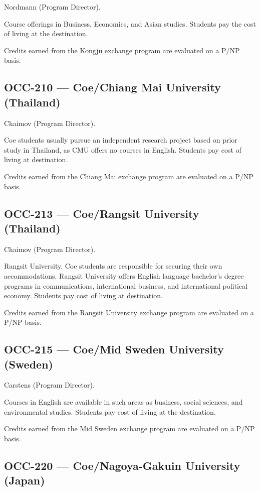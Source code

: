 \documentclass[
  letterpaper,
]{scrbook}
\begin{document}
Nordmann (Program Director).

Course offerings in Business, Economics, and Asian studies. Students pay
the cost of living at the destination.

Credits earned from the Kongju exchange program are evaluated on a P/NP
basis.

\subsection{OCC-210 --- Coe/Chiang Mai University
(Thailand)}\label{occ-210-coechiang-mai-university-thailand}

Chaimov (Program Director).

Coe students usually pursue an independent research project based on
prior study in Thailand, as CMU offers no courses in English. Students
pay cost of living at destination.

Credits earned from the Chiang Mai exchange program are evaluated on a
P/NP basis.

\subsection{OCC-213 --- Coe/Rangsit University
(Thailand)}\label{occ-213-coerangsit-university-thailand}

Chaimov (Program Director).

Rangsit University. Coe students are responsible for securing their own
accommodations. Rangsit University offers English language bachelor's
degree programs in communications, international business, and
international political economy. Students pay cost of living at
destination.

Credits earned from the Rangsit University exchange program are
evaluated on a P/NP basis.

\subsection{OCC-215 --- Coe/Mid Sweden University
(Sweden)}\label{occ-215-coemid-sweden-university-sweden}

Carstens (Program Director).

Courses in English are available in such areas as business, social
sciences, and environmental studies. Students pay cost of living at the
destination.

Credits earned from the Mid Sweden exchange program are evaluated on a
P/NP basis.

\subsection{OCC-220 --- Coe/Nagoya-Gakuin University
(Japan)}\label{occ-220-coenagoya-gakuin-university-japan}
\end{document}
